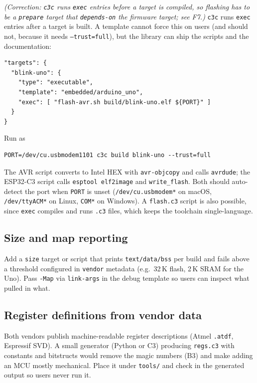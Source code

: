 \documentclass[11pt,a4paper]{article}
\newcommand{\pkg}[1]{\texttt{#1}}
\begin{document}
\textit{(Correction: \pkg{c3c} runs \pkg{exec} entries before a target is compiled, so flashing has to be a \pkg{prepare} target that \pkg{depends-on} the firmware target; see F7.)}
\pkg{c3c} runs \pkg{exec} entries after a target is built. A template cannot force this on users
(and should not, because it needs \pkg{--trust=full}), but the library can ship the scripts and
the documentation:

\begin{lstlisting}
"targets": {
  "blink-uno": {
    "type": "executable",
    "template": "embedded/arduino_uno",
    "exec": [ "flash-avr.sh build/blink-uno.elf ${PORT}" ]
  }
}
\end{lstlisting}

\noindent
Run as

\begin{lstlisting}
PORT=/dev/cu.usbmodem1101 c3c build blink-uno --trust=full
\end{lstlisting}
\noindent
The AVR script converts
to Intel HEX with \pkg{avr-objcopy} and calls \pkg{avrdude}; the ESP32-C3 script calls
\pkg{esptool elf2image} and \pkg{write\_flash}. Both should auto-detect the port when
\pkg{PORT} is unset (\pkg{/dev/cu.usbmodem*} on macOS, \pkg{/dev/ttyACM*} on Linux, \pkg{COM*} on
Windows). A \pkg{flash.c3} script is also possible, since \pkg{exec} compiles and runs \pkg{.c3}
files, which keeps the toolchain single-language.

\subsection{Size and map reporting}

Add a \pkg{size} target or script that prints \pkg{text/data/bss} per build and fails above a
threshold configured in \pkg{vendor} metadata (e.g.\ 32\,K flash, 2\,K SRAM for the Uno). Pass
\pkg{-Map} via \pkg{link-args} in the debug template so users can inspect what pulled in what.

\subsection{Register definitions from vendor data}

Both vendors publish machine-readable register descriptions (Atmel \pkg{.atdf}, Espressif
SVD). A small generator (Python or C3) producing \pkg{regs.c3} with constants and bitstructs
would remove the magic numbers (B3) and make adding an MCU mostly mechanical. Place it under
\pkg{tools/} and check in the generated output so users never run it.
\end{document}
